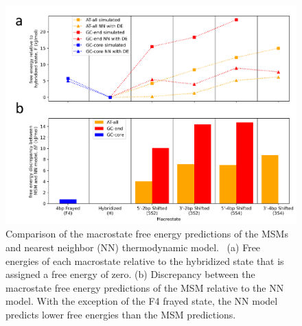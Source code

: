 \documentclass[journal=jpcbfk,manuscript=article]{achemso}
\begin{document}


\begin{figure}[ht!]
	\begin{center} 
        \includegraphics[width=160mm, scale=1]{Fig3.pdf}
        \caption{Comparison of the macrostate free energy predictions of the MSMs and nearest neighbor (NN) thermodynamic model.~\citep{SantaLucia1998AThermodynamics, Santalucia2004TheMotifs} (a) Free energies of each macrostate relative to the hybridized state that is assigned a free energy of zero. (b) Discrepancy between the macrostate free energy predictions of the MSM relative to the NN model. With the exception of the F4 frayed state, the NN model predicts lower free energies than the MSM predictions.}
        \label{fig:NN_table}
	\end{center}
\end{figure}
\end{document}
